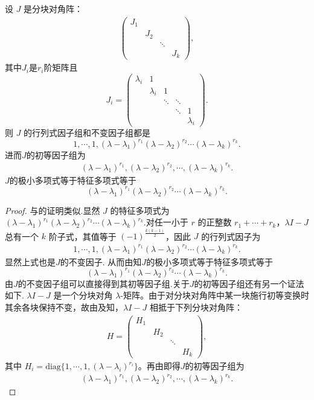 \documentclass[../../main.tex]{subfiles}%
\begin{document}
\begin{lemma}\label{lemma:Jordan矩阵的初等因子组}
设 $J$ 是分块对角阵：
\begin{align*}
\begin{pmatrix}
J_1 & & & \\
& J_2 & & \\
& & \ddots & \\
& & & J_k
\end{pmatrix},
\end{align*}
其中$J_i$是$r_i$阶矩阵且
\[
J_i = \begin{pmatrix}
\lambda_i & 1 & & & \\
& \lambda_i & 1 & & \\
& & \ddots & \ddots & \\
& & & \ddots & 1 \\
& & & & \lambda_i
\end{pmatrix}.
\]
则 $J$ 的行列式因子组和不变因子组都是
\[
1,\cdots,1,(\lambda - \lambda_1)^{r_1}(\lambda - \lambda_2)^{r_2}\cdots(\lambda - \lambda_k)^{r_k}.
\]
进而$J$的初等因子组为
\begin{align*}
(\lambda - \lambda_1)^{r_1}, (\lambda - \lambda_2)^{r_2}, \cdots, (\lambda - \lambda_k)^{r_k}.
\end{align*}
$J$的极小多项式等于特征多项式等于
$$
(\lambda - \lambda_1)^{r_1}(\lambda - \lambda_2)^{r_2}\cdots(\lambda - \lambda_k)^{r_k}.
$$
\end{lemma}
\begin{proof}
与的证明类似.显然 $J$ 的特征多项式为 $(\lambda - \lambda_1)^{r_1}(\lambda - \lambda_2)^{r_2}\cdots(\lambda - \lambda_k)^{r_k}.$对任一小于 $r$ 的正整数 $r_1+\cdots+r_k$，$\lambda I - J$ 总有一个 $k$ 阶子式，其值等于 $(-1)^{\frac{k(k-1)}{2}}$，因此 $J$ 的行列式因子为
\begin{align*}
1,\cdots,1,(\lambda - \lambda_1)^{r_1}(\lambda - \lambda_2)^{r_2}\cdots(\lambda - \lambda_k)^{r_k}.
\end{align*}
显然上式也是$J$的不变因子.
从而由知$J$的极小多项式等于特征多项式等于
$$
(\lambda - \lambda_1)^{r_1}(\lambda - \lambda_2)^{r_2}\cdots(\lambda - \lambda_k)^{r_k}.
$$
由$J$的不变因子组可以直接得到其初等因子组.关于$J$的初等因子组还有另一个证法如下.
$\lambda I - J$ 是一个分块对角 $\lambda$-矩阵。由于对分块对角阵中某一块施行初等变换时其余各块保持不变，故由及知，$\lambda I - J$ 相抵于下列分块对角阵：
\begin{align*}
H = \begin{pmatrix}
H_1 & & & \\
& H_2 & & \\
& & \ddots & \\
& & & H_k
\end{pmatrix},
\end{align*}
其中 $H_i = \mathrm{diag}\{1,\cdots,1,(\lambda - \lambda_i)^{r_i}\}$。再由即得$J$的初等因子组为
\begin{align*}
(\lambda - \lambda_1)^{r_1}, (\lambda - \lambda_2)^{r_2}, \cdots, (\lambda - \lambda_k)^{r_k}.
\end{align*}
\end{proof}
\end{document}
